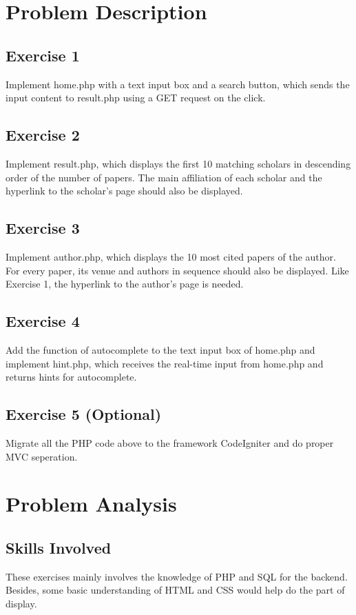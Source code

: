 \documentclass[a4paper]{article}
\begin{document}
    \tableofcontents
    \newpage
    \section{Problem Description}
        \subsection{Exercise 1}
Implement home.php with a text input box and a search button, which sends the input content to result.php using a GET request on the click.
        \subsection{Exercise 2}
Implement result.php, which displays the first 10 matching scholars in descending order of the number of papers. The main affiliation of each scholar and the hyperlink to the scholar's page should also be displayed.
        \subsection{Exercise 3}
Implement author.php, which displays the 10 most cited papers of the author. For every paper, its venue and authors in sequence should also be displayed. Like Exercise 1, the hyperlink to the author's page is needed.
        \subsection{Exercise 4}
Add the function of autocomplete to the text input box of home.php and implement hint.php, which receives the real-time input from home.php and returns hints for autocomplete.
        \subsection{Exercise 5 (Optional)}
Migrate all the PHP code above to the framework CodeIgniter and do proper MVC seperation.
    \section{Problem Analysis}
        \subsection{Skills Involved}
These exercises mainly involves the knowledge of PHP and SQL for the backend. Besides, some basic understanding of HTML and CSS would help do the part of display.
\end{document}
